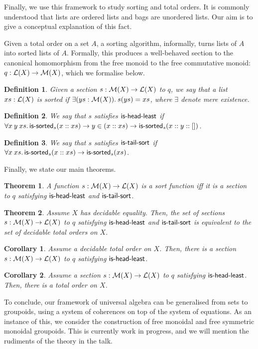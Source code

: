 \documentclass{article}
\newtheorem{definition}{Definition}
\newtheorem{theorem}{Theorem}
\newtheorem{corollary}{Corollary}[theorem]
\begin{document}
Finally, we use this framework to study sorting and total orders. It is commonly understood that lists are ordered
lists and bags are unordered lists. Our aim is to give a conceptual explanation of this fact.

Given a total order on a set $A$, a sorting algorithm, informally, turns lists of $A$ into sorted lists of $A$.
%
Formally, this produces a well-behaved section to the canonical homomorphism from the free monoid to the free
commutative monoid: $q : \mathcal{L}(X) \to \mathcal{M}(X)$, which we formalise below.

\begin{definition}
    Given a section $s : \mathcal{M}(X) \to \mathcal{L}(X)$ to $q$,
    we say that a list $xs : \mathcal{L}(X)$ is sorted if $\exists (ys : \mathcal{M}(X)). \: s(ys) = xs$,
    where $\exists$ denote mere existence.
\end{definition}

\begin{definition}
    We say that $s$ satisfies $\operatorname{\mathsf{is-head-least}}$ if
    $\forall x \: y \: xs. \operatorname{\mathsf{is-sorted}}_{s}(x :: xs) \to y \in (x :: xs) \to \operatorname{\mathsf{is-sorted}}_{s}(x :: y :: [])$.
\end{definition}

\begin{definition}
    We say that $s$ satisfies $\operatorname{\mathsf{is-tail-sort}}$ if
    $\forall x \: xs. \operatorname{\mathsf{is-sorted}}_{s}(x :: xs) \to \operatorname{\mathsf{is-sorted}}_{s}(xs)$.
\end{definition}

\noindent
Finally, we state our main theorems.

\begin{theorem}
    A function $s : \mathcal{M}(X) \to \mathcal{L}(X)$ is a sort function iff
    it is a section to $q$ 
    satisfying $\operatorname{\mathsf{is-head-least}}$ and $\operatorname{\mathsf{is-tail-sort}}$.
\end{theorem}

\begin{theorem}
    Assume $X$ has decidable equality.
    Then, the set of sections $s : \mathcal{M}(X) \to \mathcal{L}(X)$ to $q$
    satisfying $\operatorname{\mathsf{is-head-least}}$ and $\operatorname{\mathsf{is-tail-sort}}$
    is equivalent to the set of decidable total orders on $X$.
\end{theorem}

\begin{corollary}
    Assume a decidable total order on $X$.
    Then, there is a section $s : \mathcal{M}(X) \to \mathcal{L}(X)$ to $q$ satisfying $\operatorname{\mathsf{is-head-least}}$.
\end{corollary}

\begin{corollary}
    Assume a section $s : \mathcal{M}(X) \to \mathcal{L}(X)$ to $q$ satisfying $\operatorname{\mathsf{is-head-least}}$.
    Then, there is a total order on $X$.
\end{corollary}

\medskip\noindent
To conclude, our framework of universal algebra can be generalised from sets to groupoids, using a system of
coherences on top of the system of equations. As an instance of this, we consider the construction of free monoidal and
free symmetric monoidal groupoids. This is currently work in progress, and we will mention the rudiments of the theory
in the talk.

\printbibliography
\end{document}
